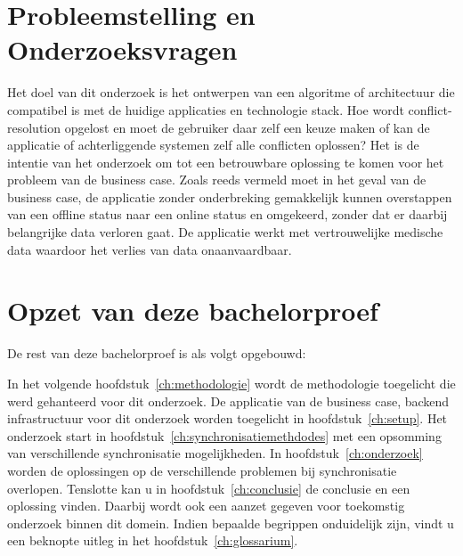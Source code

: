 \section{Probleemstelling en Onderzoeksvragen}
\label{sec:onderzoeksvragen}
Het doel van dit onderzoek is het ontwerpen van een algoritme of architectuur die compatibel is met de huidige applicaties en technologie stack. Hoe wordt conflict-resolution opgelost en moet de gebruiker daar zelf een keuze maken of kan de applicatie of achterliggende systemen zelf alle conflicten oplossen? Het is de intentie van het onderzoek om tot een betrouwbare oplossing te komen voor het probleem van de business case. Zoals reeds vermeld moet in het geval van de business case, de applicatie zonder onderbreking gemakkelijk kunnen overstappen van een offline status naar een online status en omgekeerd, zonder dat er daarbij belangrijke data verloren gaat. De applicatie werkt met vertrouwelijke medische data waardoor het verlies van data onaanvaardbaar.

\clearpage
\section{Opzet van deze bachelorproef}
\label{sec:opzet-bachelorproef}


De rest van deze bachelorproef is als volgt opgebouwd:

In het volgende hoofdstuk~\ref{ch:methodologie} wordt de methodologie toegelicht die werd gehanteerd voor dit onderzoek. De applicatie van de business case, backend infrastructuur voor dit onderzoek worden toegelicht in hoofdstuk~\ref{ch:setup}. Het onderzoek start in hoofdstuk~\ref{ch:synchronisatiemethdodes} met een opsomming van verschillende synchronisatie mogelijkheden. In hoofdstuk~\ref{ch:onderzoek} worden de oplossingen op de verschillende problemen bij synchronisatie overlopen. Tenslotte kan u in hoofdstuk~\ref{ch:conclusie} de conclusie en een oplossing vinden. Daarbij wordt ook een aanzet gegeven voor toekomstig onderzoek binnen dit domein. Indien bepaalde begrippen onduidelijk zijn, vindt u een beknopte uitleg in het hoofdstuk~\ref{ch:glossarium}.


